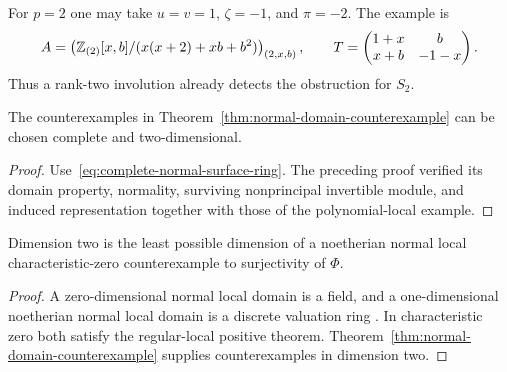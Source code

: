 \begin{example}
For $p=2$ one may take $u=v=1$, $\zeta=-1$, and $\pi=-2$.  The example
is
\[
 A=\left(\mathbb Z_{(2)}[x,b]/(x(x+2)+xb+b^2)\right)_{(2,x,b)},
 \qquad
 T=\begin{pmatrix}1+x&b\\x+b&-1-x\end{pmatrix}.
\]
Thus a rank-two involution already detects the obstruction for $S_2$.
\end{example}

\begin{corollary}\label{cor:complete-normal-domain-counterexample}
The counterexamples in Theorem~\ref{thm:normal-domain-counterexample}
can be chosen complete and two-dimensional.
\end{corollary}

\begin{proof}
Use~\eqref{eq:complete-normal-surface-ring}.  The preceding proof
verified its domain property, normality, surviving nonprincipal
invertible module, and induced representation together with those of
the polynomial-local example.
\end{proof}

\begin{corollary}\label{cor:minimal-normal-dimension}
Dimension two is the least possible dimension of a noetherian normal
local characteristic-zero counterexample to surjectivity of $\Phi$.
\end{corollary}

\begin{proof}
A zero-dimensional normal local domain is a field, and a
one-dimensional noetherian normal local domain is a discrete valuation
ring \citep[Lemma 10.119.7, Tag 00PD]{Stacks2026}.  In characteristic zero both satisfy the regular-local positive
theorem.  Theorem~\ref{thm:normal-domain-counterexample} supplies
counterexamples in dimension two.
\end{proof}
